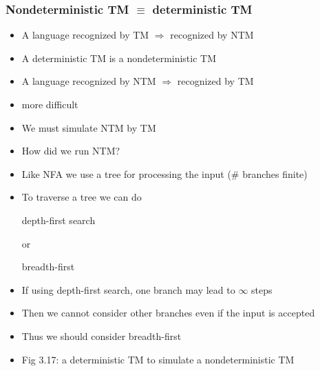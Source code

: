 




\begin{frame} \frametitle{Nondeterministic TM $
\equiv$ deterministic TM}
  \begin{itemize}
\item A language recognized by TM
$\Rightarrow$ recognized by NTM
\item
  [] A deterministic TM is a nondeterministic TM
\item A language recognized by NTM
$\Rightarrow$ recognized by TM
\item
  [] more difficult
\item
  We must simulate NTM by TM
\item
  How did we run NTM?
\item[]
  Like NFA we use a tree for processing the input
(\# branches finite)
\item
  To traverse a tree we can do
  \begin{center}
  depth-first search
\end{center}
  or
  \begin{center}
  breadth-first
\end{center}
\item If using depth-first search, one branch 
may lead to $\infty$ steps
\item [] Then we cannot consider other branches even if the
  input is accepted

  
\item
  Thus we should consider breadth-first
  
\item Fig 3.17: a deterministic TM to simulate a nondeterministic TM

\begin{center}
\end{center}
\end{itemize}
\end{frame}
